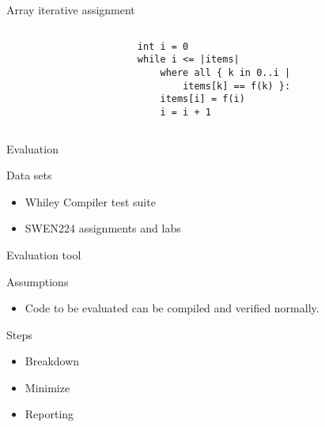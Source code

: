 \begin{frame}[fragile]{Array iterative assignment}

\begin{columns}

\begin{column}{0.5\textwidth}
\end{column}

\begin{column}{0.5\textwidth}
\begin{verbatim}
int i = 0
while i <= |items|
    where all { k in 0..i |
        items[k] == f(k) }:
    items[i] = f(i)
    i = i + 1
\end{verbatim}
\end{column}

\end{columns}

\end{frame}

\begin{frame}{Evaluation}

\begin{block}{Data sets}

\begin{itemize}
\item Whiley Compiler test suite
\item SWEN224 assignments and labs
\end{itemize}

\end{block}

\end{frame}



\begin{frame}{Evaluation tool}

\begin{block}{Assumptions}

\begin{itemize}
\item Code to be evaluated can be compiled and verified normally.
\end{itemize}

\end{block}


\begin{block}{Steps}
\begin{itemize}
\item Breakdown
\item Minimize
\item Reporting
\end{itemize}
\end{block}

\end{frame}



